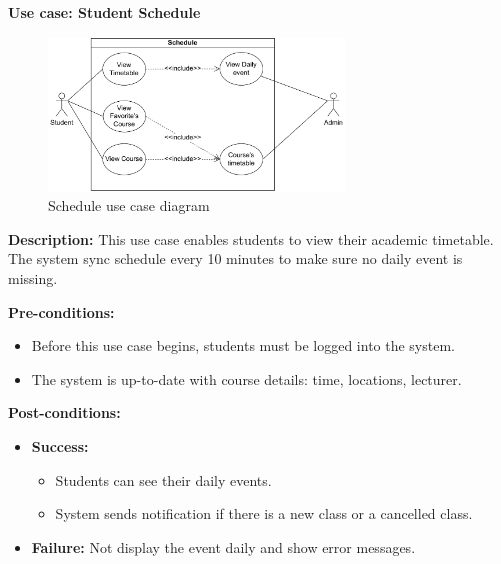 \documentclass[12pt]{article}
\begin{document}
\textbf{Use case: Student Schedule} \\

    \begin{figure}[H]
        \centering
        \includegraphics[width=0.7\textwidth]{image/StudentScheduleUseCase.pdf} 
        \caption{Schedule use case diagram}
        \label{fig:schedule_use_case}
    \end{figure}
    \textbf{Description:} This use case enables students to view their academic timetable. The system sync schedule every 10 minutes to make sure no daily event is missing. \\

    \pagebreak

    \noindent \textbf{Pre-conditions:} 
        \begin{itemize}
            \item Before this use case begins, students must be logged into the system.
            \item The system is up-to-date with course details: time, locations, lecturer.
        \end{itemize}

    \noindent \textbf{Post-conditions:}
    \begin{itemize}
        \item \textbf{Success:} 
        \begin{itemize}
            \item Students can see their daily events.
            \item System sends notification if there is a new class or a cancelled class.
        \end{itemize}
        \item \textbf{Failure:} Not display the event daily and show error messages.
    \end{itemize}
\end{document}
